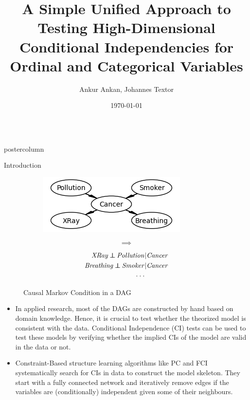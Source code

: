 \documentclass{beamer}
\title{\huge A Simple Unified Approach to Testing High-Dimensional Conditional Independencies for Ordinal and Categorical Variables}
\author{Ankur Ankan, Johannes Textor}
\institute[RU]{Institute for Computing and Information Sciences \\ Radboud University, Netherlands}
\date{\today}
\def\ci{\perp\!\!\!\!\!\perp}
\newlength{\columnheight}
\begin{document}
\begin{frame}
\begin{columns}
	\begin{column}{.33\textwidth}
		\begin{beamercolorbox}[center]{postercolumn}
			\begin{minipage}{.98\textwidth}  %
				\parbox[t][\columnheight]{\textwidth}{ %
	\begin{myblock}{Introduction}
		\begin{figure}
			\begin{subfigure}{0.4\textwidth}
				\centering
				\includegraphics[scale=1.5]{../in_person/imgs/example_dag.png}
			\end{subfigure}\hfill%
			\begin{subfigure}{0.1\textwidth}
				$$ \bm{\implies} $$
			\end{subfigure}\hfill%
			\begin{subfigure}{0.5\textwidth}
				\begin{equation*}
					\begin{split}
						\text{\emph{XRay}} \ci \text{\emph{Pollution}}  &| \text{\emph{Cancer}} \\
						\text{\emph{Breathing}} \ci \text{\emph{Smoker}} &| \text{\emph{Cancer}} \\
						\cdot \cdot \cdot & \\
					\end{split}
				\end{equation*}
			\end{subfigure}
			\caption*{Causal Markov Condition in a DAG \footnotemark}
		\end{figure}
		\begin{itemize}
			\item \justifying In applied research, most of the DAGs are constructed by
				hand based on domain knowledge. Hence, it is crucial 
				to test whether the theorized model is consistent with
				the data. Conditional Independence (CI) tests can be
				used to test these models by verifying whether the
				implied CIs of the model are valid in the data or not.
			\item \justifying Constraint-Based structure learning algorithms like PC and FCI systematically search
				for CIs in data to construct the model skeleton. They start with
				a fully connected network and iteratively remove edges if the variables 
				are (conditionally) independent given some of their neighbours.
		\end{itemize}


\end{myblock}}
\end{minipage}
\end{beamercolorbox}
\end{column}
\end{columns}
\end{frame}
\end{document}
